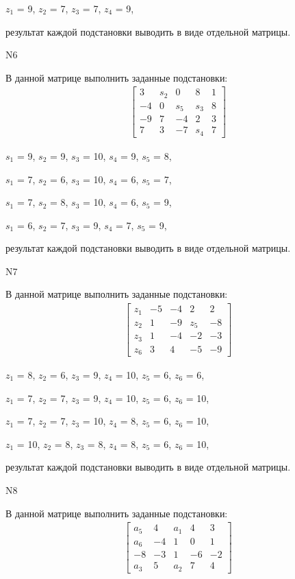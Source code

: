 \documentclass[11pt]{report}
\begin{document}
$z_{1}$ = 9, $z_{2}$ = 7, $z_{3}$ = 7, $z_{4}$ = 9, 

результат каждой подстановки выводить в виде отдельной матрицы.

N6

В данной матрице выполнить заданные подстановки:
\begin{align*}
\left[\begin{matrix}3 & s_{2} & 0 & 8 & 1\\-4 & 0 & s_{5} & s_{3} & 8\\-9 & 7 & -4 & 2 & 3\\7 & 3 & -7 & s_{4} & 7\end{matrix}\right]
\end{align*}


$s_{1}$ = 9, $s_{2}$ = 9, $s_{3}$ = 10, $s_{4}$ = 9, $s_{5}$ = 8, 

$s_{1}$ = 7, $s_{2}$ = 6, $s_{3}$ = 10, $s_{4}$ = 6, $s_{5}$ = 7, 

$s_{1}$ = 7, $s_{2}$ = 8, $s_{3}$ = 10, $s_{4}$ = 6, $s_{5}$ = 9, 

$s_{1}$ = 6, $s_{2}$ = 7, $s_{3}$ = 9, $s_{4}$ = 7, $s_{5}$ = 9, 

результат каждой подстановки выводить в виде отдельной матрицы.

N7

В данной матрице выполнить заданные подстановки:
\begin{align*}
\left[\begin{matrix}z_{1} & -5 & -4 & 2 & 2\\z_{2} & 1 & -9 & z_{5} & -8\\z_{3} & 1 & -4 & -2 & -3\\z_{6} & 3 & 4 & -5 & -9\end{matrix}\right]
\end{align*}


$z_{1}$ = 8, $z_{2}$ = 6, $z_{3}$ = 9, $z_{4}$ = 10, $z_{5}$ = 6, $z_{6}$ = 6, 

$z_{1}$ = 7, $z_{2}$ = 7, $z_{3}$ = 9, $z_{4}$ = 10, $z_{5}$ = 6, $z_{6}$ = 10, 

$z_{1}$ = 7, $z_{2}$ = 7, $z_{3}$ = 10, $z_{4}$ = 8, $z_{5}$ = 6, $z_{6}$ = 10, 

$z_{1}$ = 10, $z_{2}$ = 8, $z_{3}$ = 8, $z_{4}$ = 8, $z_{5}$ = 6, $z_{6}$ = 10, 

результат каждой подстановки выводить в виде отдельной матрицы.

N8

В данной матрице выполнить заданные подстановки:
\begin{align*}
\left[\begin{matrix}a_{5} & 4 & a_{1} & 4 & 3\\a_{6} & -4 & 1 & 0 & 1\\-8 & -3 & 1 & -6 & -2\\a_{3} & 5 & a_{2} & 7 & 4\end{matrix}\right]
\end{align*}
\end{document}
